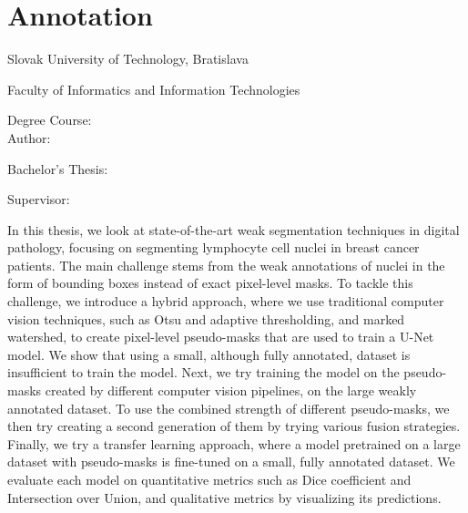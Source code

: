 
\thispagestyle{empty}

\section*{Annotation}

\begin{minipage}[t]{1\columnwidth}%
Slovak University of Technology, Bratislava 

Faculty of Informatics and Information Technologies

Degree Course: \myStudyProgram\\

Author: \myName

Bachelor's Thesis: \myTitle

Supervisor: \mySupervisor

\myDate%
\end{minipage}

\bigskip{}


In this thesis, we look at state-of-the-art weak segmentation techniques in digital pathology, focusing on segmenting lymphocyte cell nuclei in breast cancer patients. The main challenge stems from the weak annotations of nuclei in the form of bounding boxes instead of exact pixel-level masks. To tackle this challenge, we introduce a hybrid approach, where we use traditional computer vision techniques, such as Otsu and adaptive thresholding, and marked watershed, to create pixel-level pseudo-masks that are used to train a U-Net model. 
We show that using a small, although fully annotated, dataset is insufficient to train the model. Next, we try training the model on the pseudo-masks created by different computer vision pipelines, on the large weakly annotated dataset. To use the combined strength of different pseudo-masks, we then try creating a second generation of them by trying various fusion strategies. Finally, we try a transfer learning approach, where a model pretrained on a large dataset with pseudo-masks is fine-tuned on a small, fully annotated dataset. We evaluate each model on quantitative metrics such as Dice coefficient and Intersection over Union, and qualitative metrics by visualizing its predictions.

